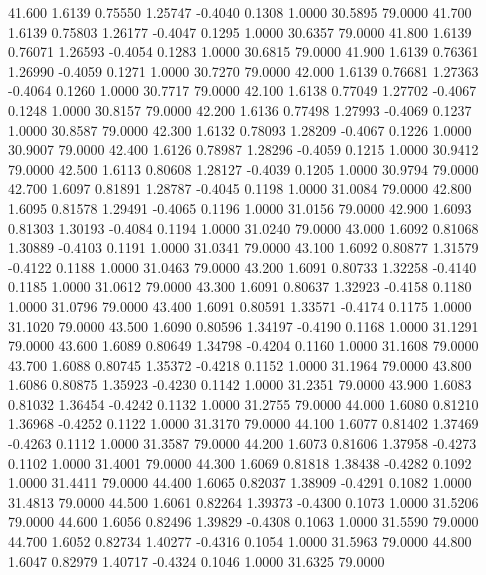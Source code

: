   41.600   1.6139   0.75550   1.25747  -0.4040   0.1308   1.0000  30.5895  79.0000
  41.700   1.6139   0.75803   1.26177  -0.4047   0.1295   1.0000  30.6357  79.0000
  41.800   1.6139   0.76071   1.26593  -0.4054   0.1283   1.0000  30.6815  79.0000
  41.900   1.6139   0.76361   1.26990  -0.4059   0.1271   1.0000  30.7270  79.0000
  42.000   1.6139   0.76681   1.27363  -0.4064   0.1260   1.0000  30.7717  79.0000
  42.100   1.6138   0.77049   1.27702  -0.4067   0.1248   1.0000  30.8157  79.0000
  42.200   1.6136   0.77498   1.27993  -0.4069   0.1237   1.0000  30.8587  79.0000
  42.300   1.6132   0.78093   1.28209  -0.4067   0.1226   1.0000  30.9007  79.0000
  42.400   1.6126   0.78987   1.28296  -0.4059   0.1215   1.0000  30.9412  79.0000
  42.500   1.6113   0.80608   1.28127  -0.4039   0.1205   1.0000  30.9794  79.0000
  42.700   1.6097   0.81891   1.28787  -0.4045   0.1198   1.0000  31.0084  79.0000
  42.800   1.6095   0.81578   1.29491  -0.4065   0.1196   1.0000  31.0156  79.0000
  42.900   1.6093   0.81303   1.30193  -0.4084   0.1194   1.0000  31.0240  79.0000
  43.000   1.6092   0.81068   1.30889  -0.4103   0.1191   1.0000  31.0341  79.0000
  43.100   1.6092   0.80877   1.31579  -0.4122   0.1188   1.0000  31.0463  79.0000
  43.200   1.6091   0.80733   1.32258  -0.4140   0.1185   1.0000  31.0612  79.0000
  43.300   1.6091   0.80637   1.32923  -0.4158   0.1180   1.0000  31.0796  79.0000
  43.400   1.6091   0.80591   1.33571  -0.4174   0.1175   1.0000  31.1020  79.0000
  43.500   1.6090   0.80596   1.34197  -0.4190   0.1168   1.0000  31.1291  79.0000
  43.600   1.6089   0.80649   1.34798  -0.4204   0.1160   1.0000  31.1608  79.0000
  43.700   1.6088   0.80745   1.35372  -0.4218   0.1152   1.0000  31.1964  79.0000
  43.800   1.6086   0.80875   1.35923  -0.4230   0.1142   1.0000  31.2351  79.0000
  43.900   1.6083   0.81032   1.36454  -0.4242   0.1132   1.0000  31.2755  79.0000
  44.000   1.6080   0.81210   1.36968  -0.4252   0.1122   1.0000  31.3170  79.0000
  44.100   1.6077   0.81402   1.37469  -0.4263   0.1112   1.0000  31.3587  79.0000
  44.200   1.6073   0.81606   1.37958  -0.4273   0.1102   1.0000  31.4001  79.0000
  44.300   1.6069   0.81818   1.38438  -0.4282   0.1092   1.0000  31.4411  79.0000
  44.400   1.6065   0.82037   1.38909  -0.4291   0.1082   1.0000  31.4813  79.0000
  44.500   1.6061   0.82264   1.39373  -0.4300   0.1073   1.0000  31.5206  79.0000
  44.600   1.6056   0.82496   1.39829  -0.4308   0.1063   1.0000  31.5590  79.0000
  44.700   1.6052   0.82734   1.40277  -0.4316   0.1054   1.0000  31.5963  79.0000
  44.800   1.6047   0.82979   1.40717  -0.4324   0.1046   1.0000  31.6325  79.0000
